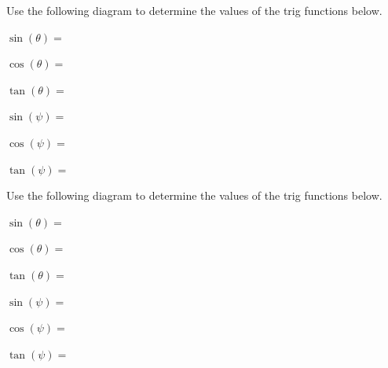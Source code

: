 
\begin{problem}
\item Use the following diagram to determine the values of the trig
  functions below.

  \begin{multicols}{2}

      \scalebox{0.35}{}

      \columnbreak

      \begin{subproblem}
      \item $\sin(\theta) = $ \vfill
      \item $\cos(\theta) = $ \vfill
      \item $\tan(\theta) = $ \vfill
      \item $\sin(\psi) = $ \vfill
      \item $\cos(\psi) = $ \vfill
      \item $\tan(\psi) = $ \vfill
      \end{subproblem}
  \end{multicols}

\item Use the following diagram to determine the values of the trig
  functions below.

  \begin{multicols}{2}
    \scalebox{0.35}{}

    \columnbreak

    \begin{subproblem}
    \item $\sin(\theta) = $ \vfill
    \item $\cos(\theta) = $ \vfill
    \item $\tan(\theta) = $ \vfill
    \item $\sin(\psi) = $ \vfill
    \item $\cos(\psi) = $ \vfill
    \item $\tan(\psi) = $ \vfill
    \end{subproblem}
  \end{multicols}
\end{problem}


